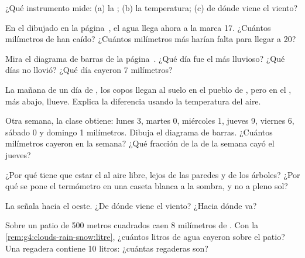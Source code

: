 \begin{exercise}[$\star$]\label{exo:g4:clouds-rain-snow:4}
¿Qué instrumento mide: (a) la ; (b) la temperatura; (c) de dónde
viene el viento?
\end{exercise}

\begin{exercise}[$\star$]\label{exo:g4:clouds-rain-snow:5}
En el  dibujado en la página~\pageref{fig:g4:clouds-rain-snow:gauge},
el agua llega ahora a la marca 17. ¿Cuántos milímetros de  han caído?
¿Cuántos milímetros más harían falta para llegar a 20?
\end{exercise}

\begin{exercise}[$\star$]\label{exo:g4:clouds-rain-snow:6}
Mira el diagrama de barras de la página~\pageref{fig:g4:clouds-rain-snow:bars}.
¿Qué día fue el más lluvioso? ¿Qué días no llovió? ¿Qué día cayeron
7 milímetros?
\end{exercise}

\begin{exercise}[$\star\star$]\label{exo:g4:clouds-rain-snow:7}
La mañana de un día de , los copos llegan al suelo en el pueblo de
, pero en el , más abajo, llueve. Explica la diferencia usando
la temperatura del aire.
\end{exercise}

\begin{exercise}[$\star\star$]\label{exo:g4:clouds-rain-snow:8}
Otra semana, la clase obtiene: lunes 3, martes 0, miércoles 1, jueves 9,
viernes 6, sábado 0 y domingo 1 milímetros. Dibuja el diagrama de barras.
¿Cuántos milímetros cayeron en la semana? ¿Qué fracción de la  de la
semana cayó el jueves?
\end{exercise}

\begin{exercise}[$\star\star$]\label{exo:g4:clouds-rain-snow:9}
¿Por qué tiene que estar el  al aire libre, lejos de las paredes
y de los árboles? ¿Por qué se pone el termómetro en una caseta blanca a la
sombra, y no a pleno sol?
\end{exercise}

\begin{exercise}[$\star\star$]\label{exo:g4:clouds-rain-snow:10}
La  señala hacia el oeste. ¿De dónde viene el viento? ¿Hacia dónde
va?
\end{exercise}

\begin{exercise}[$\star\star\star$]\label{exo:g4:clouds-rain-snow:11}
Sobre un patio de 500 metros cuadrados caen 8 milímetros de . Con la
\cref{rem:g4:clouds-rain-snow:litre}, ¿cuántos litros de agua cayeron sobre
el patio? Una regadera contiene 10 litros: ¿cuántas regaderas son?
\end{exercise}
